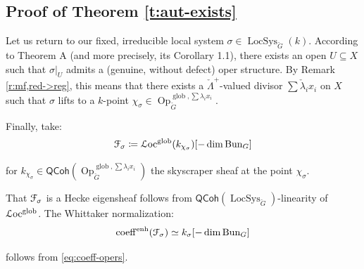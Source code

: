 \documentclass[reqno,11pt]{amsart}
\numberwithin{equation}{subsection}
\theoremstyle{remark}
\newcommand{\sF}{{\EuScript F}}
\newcommand{\sL}{{\EuScript L}}
\newcommand{\on}{\operatorname}
\newcommand{\Bun}{\on{Bun}}
\newcommand{\LocSys}{\on{LocSys}}
\newcommand{\Op}{\on{Op}}
\newcommand{\QCoh}{\mathsf{QCoh}}
\renewcommand{\subset}{\subseteq}
\newcommand{\coeff}{\on{coeff}}
\newcommand{\enh}{\on{enh}}
\begin{document}
\subsection{Proof of Theorem \ref{t:aut-exists}}\label{ss:pf-aut}

Let us return to our fixed, irreducible local system 
$\sigma \in \LocSys_{\check{G}}(k)$. According to \cite{dima-opers} 
Theorem A (and more precisely, its Corollary 1.1), there
exists an open $U \subset X$ such that $\sigma|_U$ admits a
(genuine, without defect) oper structure. By Remark \ref{r:mf,red->reg},
this means that there exists a $\check{\Lambda}^+$-valued 
divisor $\sum \check{\lambda}_i x_i$ on $X$ such that $\sigma$
lifts to a $k$-point 
$\chi_{\sigma} \in \Op_{\check{G}}^{\on{glob},\sum \lambda_i x_i}$.

Finally, take: 
%
\[
\sF_{\sigma} \coloneqq \sL\text{oc}^{\on{glob}}(k_{\chi_{\sigma}})[-\dim \Bun_G]
\]

\noindent for $k_{\chi_{\sigma}} \in \QCoh(\Op_{\check{G}}^{\on{glob},\sum \lambda_i x_i})$
the skyscraper sheaf at the point $\chi_{\sigma}$.

That $\sF_{\sigma}$ is a Hecke eigensheaf follows from 
$\QCoh(\LocSys_{\check{G}})$-linearity of $\sL\text{oc}^{\on{glob}}$.
The Whittaker normalization: 
%
\[
\coeff^{\enh}(\sF_{\sigma}) \simeq k_{\sigma}[-\dim \Bun_G]
\]

\noindent follows from \eqref{eq:coeff-opers}.






{}

\end{document}
